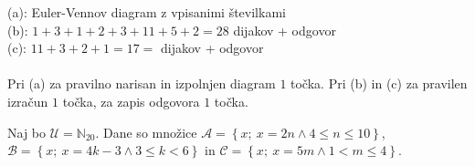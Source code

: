 \documentclass[addpoints]{exam}
\begin{document}
\begin{questions}

    \begin{solution}[8cm]
        (a): Euler-Vennov diagram z vpisanimi številkami \\
        (b): $1+3+1+2+3+11+5+2=28$ dijakov + odgovor\\
        (c): $11+3+2+1=17=$ dijakov + odgovor \\ \\
        Pri (a) za pravilno narisan in izpolnjen diagram $1$ točka. Pri (b) in (c) za pravilen izračun $1$ točka, za zapis odgovora $1$ točka.
    \end{solution}




    \newpage

    \question
    Naj bo $\mathcal{U}=\mathbb{N}_{20}$. Dane so množice $\mathcal{A}=\left\{x;\ x=2n \land 4\leq n \leq10\right\}$, $\mathcal{B}=\left\{x;\ x=4k-3 \land 3\leq k< 6\right\}$ in $\mathcal{C}=\left\{x;\ x=5m \land 1<m\leq 4\right\}$. 


\end{questions}
\end{document}

